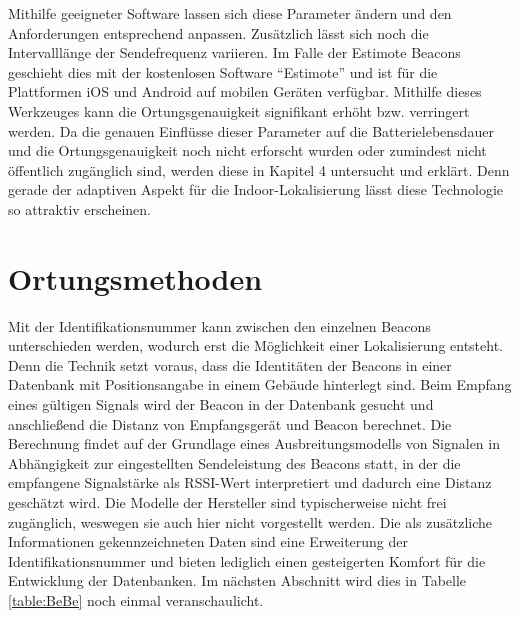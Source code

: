 Mithilfe geeigneter Software lassen sich diese Parameter ändern und den Anforderungen entsprechend anpassen. Zusätzlich lässt sich noch die Intervalllänge der Sendefrequenz variieren. Im Falle der Estimote Beacons geschieht dies mit der kostenlosen Software "`Estimote"' und ist für die Plattformen iOS und Android auf mobilen Geräten verfügbar. Mithilfe dieses Werkzeuges kann die Ortungsgenauigkeit signifikant erhöht bzw. verringert werden. Da die genauen Einflüsse dieser Parameter auf die Batterielebensdauer und die Ortungsgenauigkeit noch nicht erforscht wurden oder zumindest nicht öffentlich zugänglich sind, werden diese in Kapitel 4 untersucht und erklärt. Denn gerade der adaptiven Aspekt für die Indoor-Lokalisierung lässt diese Technologie so attraktiv erscheinen.

\section{Ortungsmethoden}
Mit der Identifikationsnummer kann zwischen den einzelnen Beacons unterschieden werden, wodurch erst die Möglichkeit einer Lokalisierung entsteht. Denn die Technik setzt voraus, dass die Identitäten der Beacons in einer Datenbank mit Positionsangabe in einem Gebäude hinterlegt sind. Beim Empfang eines gültigen Signals wird der Beacon in der Datenbank gesucht und anschließend die Distanz von Empfangsgerät und Beacon berechnet. Die Berechnung findet auf der Grundlage eines Ausbreitungsmodells von Signalen in Abhängigkeit zur eingestellten Sendeleistung des Beacons statt, in der die empfangene Signalstärke als RSSI-Wert interpretiert  und dadurch eine Distanz geschätzt wird. Die Modelle der Hersteller sind typischerweise nicht frei zugänglich, weswegen sie auch hier nicht vorgestellt werden. Die als zusätzliche Informationen gekennzeichneten Daten sind eine Erweiterung der Identifikationsnummer und bieten lediglich einen gesteigerten Komfort für die Entwicklung der Datenbanken. Im nächsten Abschnitt wird dies in Tabelle \ref{table:BeBe} noch einmal veranschaulicht.\\
